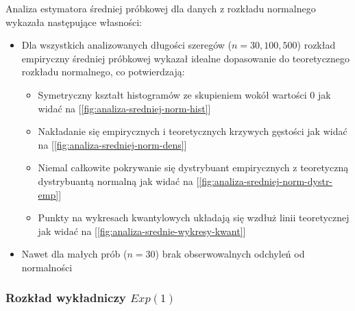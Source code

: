 \documentclass[10pt, a4paper]{article}\usepackage[]{graphicx}\usepackage[]{xcolor}
\begin{document}
Analiza estymatora średniej próbkowej dla danych z rozkładu normalnego wykazała następujące własności:

\begin{itemize}
    \item Dla wszystkich analizowanych długości szeregów ($n = 30, 100, 500$) rozkład empiryczny średniej próbkowej wykazał idealne dopasowanie do teoretycznego rozkładu normalnego, co potwierdzają:
        \begin{itemize}
            \item Symetryczny kształt histogramów ze skupieniem wokół wartości 0 jak widać na [\ref{fig:analiza-sredniej-norm-hist}]
            \item Nakładanie się empirycznych i teoretycznych krzywych gęstości jak widać na [\ref{fig:analiza-sredniej-norm-dens}]
            \item Niemal całkowite pokrywanie się dystrybuant empirycznych z teoretyczną dystrybuantą normalną jak widać na [\ref{fig:analiza-sredniej-norm-dystr-emp}]
            \item Punkty na wykresach kwantylowych układają się wzdłuż linii teoretycznej jak widać na [\ref{fig:analiza-srednie-wykresy-kwant}]
        \end{itemize}
      
      \item Nawet dla małych prób ($n = 30$) brak obserwowalnych odchyleń od normalności
\end{itemize}


\newpage
\subsubsection{Rozkład wykładniczy $Exp(1)$}
\end{document}
